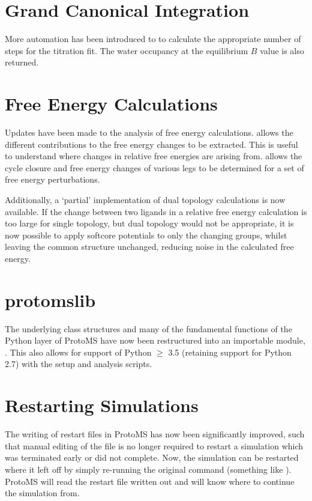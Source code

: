 \documentclass[letterpaper,10pt,english]{sphinxmanual}
\begin{document}
\section{Grand Canonical Integration}
\label{\detokenize{changelog:grand-canonical-integration}}
More automation has been introduced to  to calculate the appropriate number of steps for the titration fit. The water occupancy at the equilibrium \(B\) value is also returned.


\section{Free Energy Calculations}
\label{\detokenize{changelog:free-energy-calculations}}
Updates have been made to the analysis of free energy calculations.  allows the different contributions to the free energy changes to be extracted. This is useful to understand where changes in relative free energies are arising from.  allows the cycle closure and free energy changes of various legs to be determined for a set of free energy perturbations.

Additionally, a ‘partial’ implementation of dual topology calculations is now available. If the change between two ligands in a relative free energy calculation is too large for single topology, but dual topology would not be appropriate, it is now possible to apply softcore potentials to only the changing groups, whilst leaving the common structure unchanged, reducing noise in the calculated free energy.


\section{protomslib}
\label{\detokenize{changelog:protomslib}}
The underlying class structures and many of the fundamental functions of the Python layer of ProtoMS have now been restructured into an importable module, . This also allows for support of Python \(\geq\) 3.5 (retaining support for Python 2.7) with the setup and analysis scripts.


\section{Restarting Simulations}
\label{\detokenize{changelog:restarting-simulations}}
The writing of restart files in ProtoMS has now been significantly improved, such that manual editing of the  file is no longer required to restart a simulation which was terminated early or did not complete. Now, the simulation can be restarted where it left off by simply re-running the original command (something like ). ProtoMS will read the restart file written out and will know where to continue the simulation from.
\end{document}
